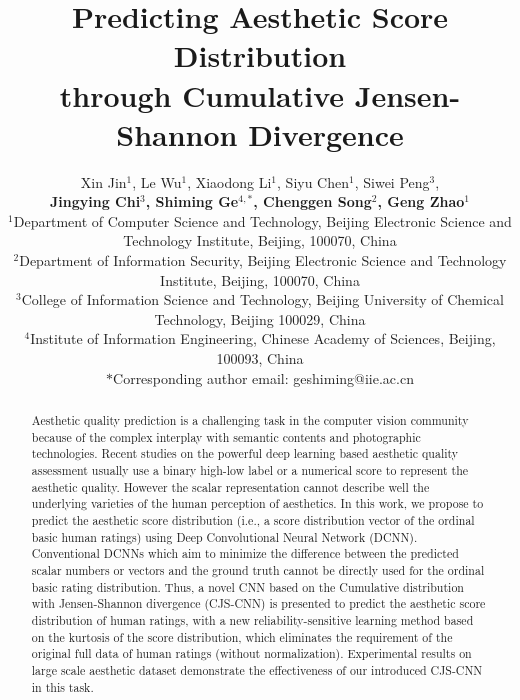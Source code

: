 \documentclass[letterpaper]{article} %
\begin{document}
%
\title{Predicting Aesthetic Score Distribution \\ through Cumulative Jensen-Shannon Divergence}
\author{Xin Jin$^1$, Le Wu$^1$, Xiaodong Li$^1$, Siyu Chen$^1$, Siwei Peng$^3$,\\ \Large{\textbf{ Jingying Chi$^3$, Shiming Ge$^{4,*}$, Chenggen Song$^2$, Geng Zhao$^1$}}\\
$^1$Department of Computer Science and Technology, 
Beijing Electronic Science and Technology Institute, Beijing, 100070, China
\\
$^2$Department of Information Security, 
Beijing Electronic Science and Technology Institute, Beijing, 100070, China
\\
$^3$College of Information Science and Technology, Beijing University of Chemical Technology, Beijing 100029, China
\\
$^4$Institute of Information Engineering, Chinese Academy of Sciences, Beijing, 100093, China
\\
$*$Corresponding author email: geshiming@iie.ac.cn\\
}
\maketitle
\begin{abstract}
Aesthetic quality prediction is a challenging task in the computer vision community because of the complex interplay with semantic contents and photographic technologies. Recent studies on the powerful deep learning based aesthetic quality assessment usually use a binary high-low label or a numerical score to represent the aesthetic quality. However the scalar representation cannot describe well the underlying varieties of the human perception of aesthetics. In this work, we propose to predict the aesthetic score distribution (i.e., a score distribution vector of the ordinal basic human ratings) using Deep Convolutional Neural Network (DCNN). Conventional DCNNs which aim to minimize the difference between the predicted scalar numbers or vectors and the ground truth cannot be directly used for the ordinal basic rating distribution. Thus, a novel CNN based on the Cumulative distribution with Jensen-Shannon divergence (CJS-CNN) is presented to predict the aesthetic score distribution of human ratings, with a new reliability-sensitive learning method based on the kurtosis of the score distribution, which eliminates the requirement of the original full data of human ratings (without normalization). Experimental results on large scale aesthetic dataset demonstrate the effectiveness of our introduced CJS-CNN in this task.
\end{abstract}
\end{document}
